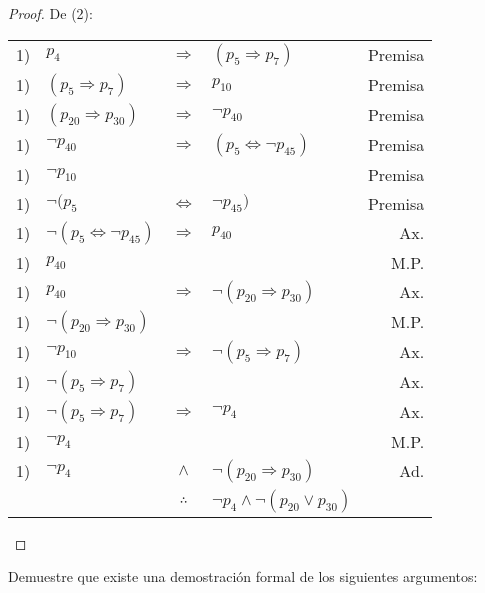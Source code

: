 \documentclass[12pt]{report}
\theoremstyle{largebreak}
\begin{document}
\begin{proof}
        De (2):
        \begin{center}
            \begin{tabular}{l l c l r}
                1) & $p_4$ & $\Rightarrow$ & $(p_5\Rightarrow p_7)$ & Premisa \\
                1) & $(p_5\Rightarrow p_7)$ & $\Rightarrow$ & $p_{10}$ & Premisa \\
                1) & $(p_{20}\Rightarrow p_{30})$ & $\Rightarrow$ & $\neg p_{40}$ & Premisa \\
                1) & $\neg p_{40}$ & $\Rightarrow$ & $(p_5\iff\neg p_{ 45})$ & Premisa \\
                1) & $\neg p_{10}$ &  &  & Premisa \\
                1) & $\neg(p_5$ & $\iff$ & $\neg p_{45})$& Premisa \\
                1) & $\neg (p_5\iff\neg p_{ 45})$ & $\Rightarrow$ & $p_{40}$ & Ax. \\
                1) & $p_{40}$ &  &  & M.P. \\
                1) & $p_{40}$ & $\Rightarrow$ & $\neg(p_{20}\Rightarrow p_{30})$ & Ax. \\
                1) & $\neg(p_{20}\Rightarrow p_{30})$ &  & & M.P. \\
                1) & $\neg p_{10}$ & $\Rightarrow$ & $\neg(p_5\Rightarrow p_7)$ & Ax. \\
                1) & $\neg(p_5\Rightarrow p_7)$ & & & Ax. \\
                1) & $\neg(p_5\Rightarrow p_7)$ & $\Rightarrow$ & $\neg p_4$ & Ax. \\
                1) & $\neg p_4$ &  &  & M.P. \\
                1) & $\neg p_4$ & $\land$ & $\neg(p_{20}\Rightarrow p_{30})$ & Ad. \\
                \hline
                & & $\therefore$ & $\neg p_4\land\neg(p_{20}\lor p_{30})$ & \\
            \end{tabular}
        \end{center}
    \end{proof}

    \begin{excer}
        Demuestre que existe una demostración formal de los siguientes argumentos:
    \end{excer}
\end{document}
